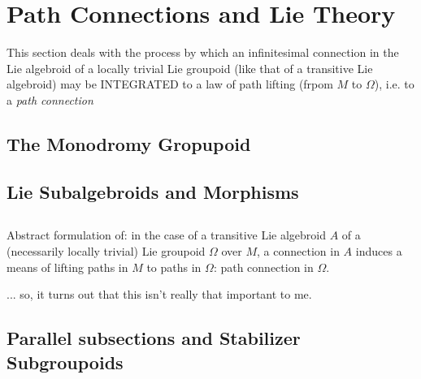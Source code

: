 \section{Path Connections and Lie Theory}

This section deals with the process by which an infinitesimal connection in the Lie algebroid of a locally trivial Lie groupoid (like that of a transitive Lie algebroid) may be INTEGRATED to a law of path lifting (frpom $M$ to $\Omega$), i.e. to a \emph{path connection}

\subsection{The Monodromy Gropupoid}

\subsection{Lie Subalgebroids and Morphisms}

\subsection{}

Abstract formulation of: in the case of a transitive Lie algebroid $A$ of a (necessarily locally trivial) Lie groupoid $\Omega$ over $M$, a connection in $A$ induces a means of lifting paths in $M$ to paths in $\Omega$: path connection in $\Omega$.

... so, it turns out that this isn't really that important to me.



\subsection{Parallel subsections and Stabilizer Subgroupoids}

